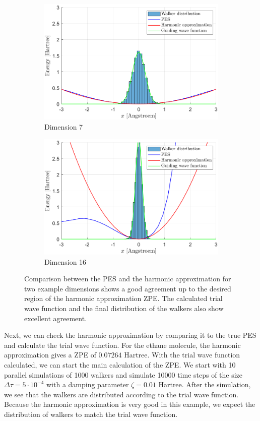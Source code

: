\documentclass [12pt]{report}
\begin{document}
\begin{figure}[h]
\begin{subfigure}{0.5\textwidth}
\includegraphics[width=\linewidth]{walkers1.png} 
\caption{Dimension 7}
\label{dim7}
\end{subfigure}
\begin{subfigure}{0.5\textwidth}
\includegraphics[width=\linewidth]{walkers2.png}
\caption{Dimension 16}
\label{dim16}
\end{subfigure}
\caption{Comparison between the PES and the harmonic approximation for two example dimensions shows a good agreement up to the desired region of the harmonic approximation ZPE. The calculated trial wave function and the final distribution of the walkers also show excellent agreement.}
\label{trialwf}
\end{figure}
Next, we can check the harmonic approximation by comparing it to the true PES and calculate the trial wave function. For the ethane molecule, the harmonic approximation gives a ZPE of $0.07264$ Hartree. With the trial wave function calculated, we can start the main calculation of the ZPE. We start with 10 parallel simulations of 1000 walkers and simulate 10000 time steps of the size $\Delta \tau = 5 \cdot 10^{-4}$ with a damping parameter $\zeta = 0.01$ Hartree. After the simulation, we see that the walkers are distributed according to the trial wave function. Because the harmonic approximation is very good in this example, we expect the distribution of walkers to match the trial wave function.
\end{document}

